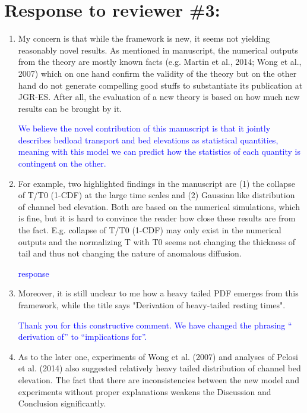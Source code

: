 \documentclass[11pt]{article}
\begin{document}
\section*{Response to reviewer \#3:}

\begin{enumerate}
	\item My concern is that while the framework is new, it seems not yielding reasonably novel results. As mentioned in manuscript, the numerical outputs from the theory are mostly known facts (e.g. Martin et al., 2014; Wong et al., 2007) which on one hand confirm the validity of the theory but on the other hand do not generate compelling good stuffs to substantiate its publication at JGR-ES. After all, the evaluation of a new theory is based on how much new results can be brought by it.
	
	\textcolor{blue}{We believe the novel contribution of this manuscript is that it jointly describes bedload transport and bed elevations as statistical quantities, meaning with this model we can predict how the statistics of each quantity is contingent on the other. }
	
	\item 
	For example, two highlighted findings in the manuscript are (1) the collapse of T/T0 (1-CDF) at the large time scales and (2) Gaussian like distribution of channel bed elevation. Both are based on the numerical simulations, which is fine, but it is hard to convince the reader how close these results are from the fact. E.g. collapse of T/T0 (1-CDF) may only exist in the numerical outputs and the normalizing T with T0 seems not changing the thickness of tail and thus not changing the nature of anomalous diffusion.
	
	\textcolor{blue}{response}
	
	
	\item Moreover, it is still unclear to me how a heavy tailed PDF emerges from this framework, while the title says "Derivation of heavy-tailed resting times". 
	
	\textcolor{blue}{Thank you for this constructive comment. We have changed the phrasing `` derivation of'' to ``implications for''.}
	
	
	\item As to the later one, experiments of Wong et al. (2007) and analyses of Pelosi et al. (2014) also suggested relatively heavy tailed distribution of channel bed elevation. The fact that there are inconsistencies between the new model and experiments without proper explanations weakens the Discussion and Conclusion significantly.
	

\end{enumerate}
\end{document}
